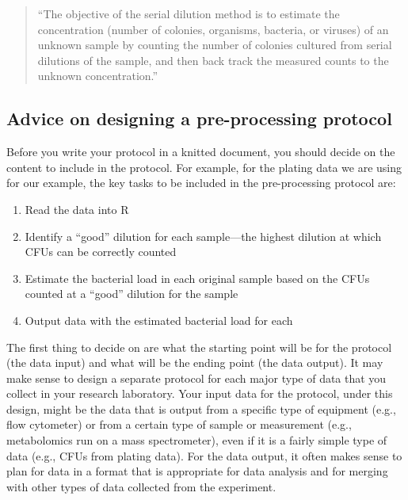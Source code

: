 \documentclass[]{tufte-book}
\providecommand{\tightlist}{%
  \setlength{\itemsep}{0pt}\setlength{\parskip}{0pt}}
\begin{document}
\begin{quote}
``The objective of the serial dilution method is to estimate the concentration
(number of colonies, organisms, bacteria, or viruses) of an unknown sample by
counting the number of colonies cultured from serial dilutions of the sample,
and then back track the measured counts to the unknown concentration.''
\citep{ben2014estimation}
\end{quote}

\hypertarget{advice-on-designing-a-pre-processing-protocol}{%
\subsection{Advice on designing a pre-processing protocol}\label{advice-on-designing-a-pre-processing-protocol}}

Before you write your protocol in a knitted document, you should decide on the
content to include in the protocol. For example, for the plating data we are
using for our example, the key tasks to be included in the pre-processing
protocol are:

\begin{enumerate}
\def\labelenumi{\arabic{enumi}.}
\tightlist
\item
  Read the data into R
\item
  Identify a ``good'' dilution for each sample---the highest dilution at which CFUs
  can be correctly counted
\item
  Estimate the bacterial load in each original sample based on the CFUs counted
  at a ``good'' dilution for the sample
\item
  Output data with the estimated bacterial load for each
\end{enumerate}

The first thing to decide on are what the starting point will be for the
protocol (the data input) and what will be the ending point (the data output).
It may make sense to design a separate protocol for each major type of
data that you collect in your research laboratory. Your input data for the
protocol, under this design, might be the data that is output from a
specific type of equipment (e.g., flow cytometer) or from a certain
type of sample or measurement (e.g., metabolomics run on a mass spectrometer),
even if it is a fairly simple type of data (e.g., CFUs from plating data).
For the data output, it often makes sense to plan for data in a format
that is appropriate for data analysis and for merging with other types of
data collected from the experiment.
\end{document}
